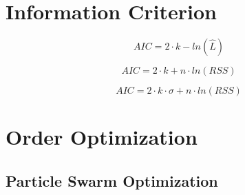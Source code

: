 \section{Information Criterion}
\label{sec:Information_Criterion}



 \begin{equation}
	AIC = 2 \cdot k-ln(\hat{L})
	\label{eq:aic_general}
\end{equation}
	


 \begin{equation}
	AIC = 2 \cdot k+n \cdot ln(RSS)
	\label{eq:aic_rms}
\end{equation}


 \begin{equation}
	AIC = 2 \cdot k \cdot \sigma + n \cdot ln(RSS)
	\label{eq:aic_rms_adapt}
\end{equation}



\section{Order Optimization}
\label{sec:order_opt}



\subsection{Particle Swarm Optimization}
\label{sec:PSO}




